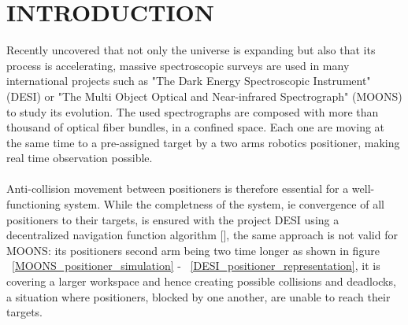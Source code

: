\documentclass[]{spie}  %
\begin{document}
	
	\section{INTRODUCTION}
	\label{INTRODUCTION}
	Recently uncovered that not only the universe is expanding but also that its process is accelerating, massive spectroscopic surveys are used in many international projects such as  "The Dark Energy Spectroscopic Instrument" (DESI) or  "The Multi Object Optical and Near-infrared Spectrograph" (MOONS) to study its evolution. The used spectrographs are composed with more than thousand of optical fiber bundles, in a confined space. Each one are moving at the same time to a pre-assigned target by a two arms robotics positioner, making real time observation possible.\\\\
	Anti-collision movement between positioners is therefore essential for a well-functioning system. While the completness of the system, ie convergence of all positioners to their targets, is ensured with the project DESI using a decentralized navigation function algorithm  [], the same approach is not valid for MOONS: its positioners second arm being two time longer as shown in figure ~\ref{MOONS_positioner_simulation} - ~\ref{DESI_positioner_representation}, it is covering a larger workspace and hence creating possible collisions and deadlocks, a situation where positioners, blocked by one another, are unable to reach their targets.\\
	
\end{document}
